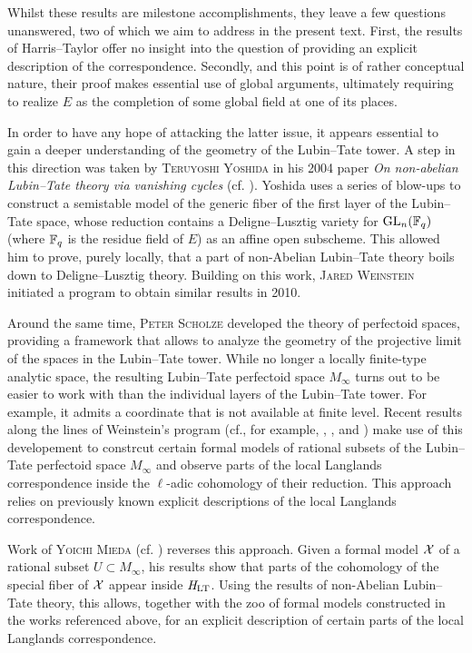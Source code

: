 \documentclass[../main.tex]{subfiles}
\begin{document}
Whilst these results are milestone accomplishments, they leave a few questions
unanswered, two of which we aim to address in the present text. 
First, the results of Harris--Taylor offer no insight into the question of
providing an explicit description of the correspondence.
Secondly, and this point is of rather conceptual nature, their proof makes
essential use of global arguments, ultimately requiring to realize $E$ as the
completion of some global field at one of its places.

In order to have any hope of attacking the latter issue, it appears essential
to gain a deeper understanding of the geometry of the Lubin--Tate tower. 
A step in this direction was taken by \textsc{Teruyoshi Yoshida} in his
2004 paper \textit{On non-abelian Lubin--Tate theory via vanishing cycles}
(cf. \cite{yoshida2010non}).
Yoshida uses a series of blow-ups to construct a
semistable model of the generic fiber of the first layer of the Lubin--Tate space,
whose reduction contains a Deligne--Lusztig variety for $\operatorname{GL}_n(\mathbb{F}_q)$ (where
$\mathbb{F}_q$ is the residue field of $E$) as an affine open subscheme. This allowed
him to prove, purely locally, that a part of non-Abelian Lubin--Tate theory
boils down to Deligne--Lusztig theory. 
Building on this work, \textsc{Jared Weinstein} initiated a program
to obtain similar results in 2010. 

Around the same time, \textsc{Peter Scholze} developed the theory of perfectoid spaces,
providing a framework that allows to analyze the geometry of the projective limit 
of the spaces in the Lubin--Tate tower. 
While no longer a locally finite-type analytic space, the resulting
Lubin--Tate perfectoid space $M_\infty$ turns out to be easier to work with than 
the individual layers of the Lubin--Tate tower. For example, it admits a
coordinate that is not available at finite level.
Recent results along the lines of Weinstein's program
(cf., for example, \cite{weinstein2016semistable},
\cite{BoyarchenkoWeinstein2011MaxVar}, \cite{imaitsushima2020affinoids} and 
\cite{tokimoto2020affinoids}) make use of this developement to constrcut
certain formal models of rational subsets of the Lubin--Tate perfectoid space
$M_{\infty}$ and observe parts of the local Langlands correspondence
inside the $\ell$-adic cohomology of their reduction. This approach relies on
previously known explicit descriptions of the local Langlands
correspondence.

Work of \textsc{Yoichi Mieda} (cf. \cite{mieda2016geometric}) reverses this
approach. Given a formal model $\mathcal{X}$ of a rational subset $U \subset M_\infty$,
his results show that parts of the cohomology of the
special fiber of $\mathcal{X}$ appear inside $\mathit H_{\mathrm{LT}}$. Using the results of non-Abelian
Lubin--Tate theory, this allows, together with the zoo of formal models
constructed in the works referenced above, for an explicit description of
certain parts of the local Langlands correspondence.
\end{document}
